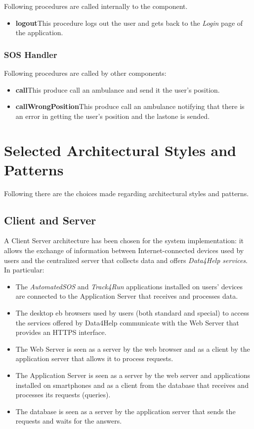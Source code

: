 \myparagraph{}
Following procedures are called internally to the component.
\begin{itemize}
  \item \textbf{logout}\quad This procedure logs out the user and gets back to the \textit{Login} page of the application.
\end{itemize}

\subsubsection{SOS Handler}
Following procedures are called by other components:
\begin{itemize}
  \item \textbf{call}\quad This produce call an ambulance and send it the user's position.
  \item \textbf{callWrongPosition}\quad This produce call an ambulance notifying that there is an error in getting the user's position and the lastone is sended.
\end{itemize}

\clearpage
\section{Selected Architectural Styles and Patterns}\label{architecturalStyle}
Following there are the choices made regarding architectural styles and patterns.

\subsection{Client and Server}
A Client Server architecture has been chosen for the system implementation: it allows the exchange of information between Internet-connected devices used by users and the centralized server that collects data and offers \textit{Data4Help services}.
In particular:
\begin{itemize}
  \item The \textit{AutomatedSOS} and \textit{Track4Run} applications installed on users' devices are connected to the Application Server that receives and processes data.
  \item The desktop eb browsers used by users (both standard and special) to access the services offered by Data4Help communicate with the Web Server that provides an HTTPS interface.
  \item The Web Server is seen as a server by the web browser and as a client by the application server that allows it to process requests.
  \item The Application Server is seen as a server by the web server and applications installed on smartphones and as a client from the database that receives and processes its requests (queries).
  \item The database is seen as a server by the application server that sends the requests and waits for the answers.
\end{itemize}


